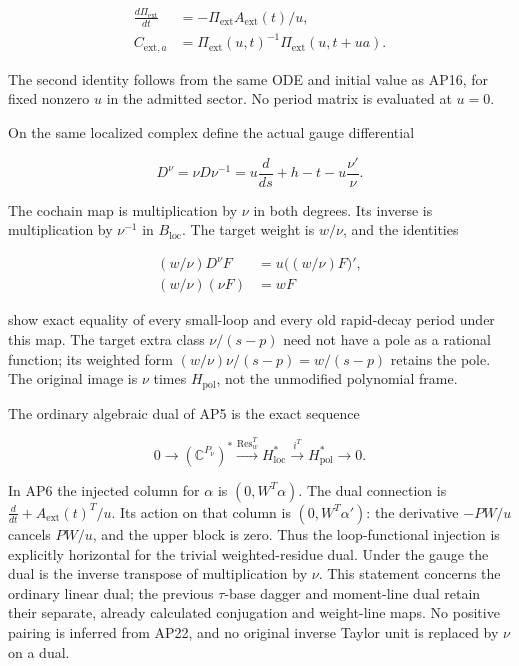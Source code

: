 \documentclass{article}
\begin{document}
\[
\begin{aligned}
\frac{d\Pi_{\mathrm{ext}}}{dt}&=-\Pi_{\mathrm{ext}}A_{\mathrm{ext}}(t)/u,\\
C_{\mathrm{ext},a}&=\Pi_{\mathrm{ext}}(u,t)^{-1}\Pi_{\mathrm{ext}}(u,t+ua).
\end{aligned}
\tag{AP19b}
\]

The second identity follows from the same ODE and initial value as AP16, for fixed nonzero \(u\) in the admitted sector. No period matrix is evaluated at \(u=0\).

On the same localized complex define the actual gauge differential

\[
D^\nu=\nu D\nu^{-1}
=u\frac{d}{ds}+h-t-u\frac{\nu'}{\nu}.
\tag{AP20}
\]

The cochain map is multiplication by \(\nu\) in both degrees. Its inverse is multiplication by \(\nu^{-1}\) in \(B_{\mathrm{loc}}\). The target weight is \(w/\nu\), and the identities

\[
\begin{aligned}
(w/\nu)D^\nu F&=u\bigl((w/\nu)F\bigr)',\\
(w/\nu)(\nu F)&=wF
\end{aligned}
\tag{AP21}
\]

show exact equality of every small-loop and every old rapid-decay period under this map. The target extra class \(\nu/(s-p)\) need not have a pole as a rational function; its weighted form \((w/\nu)\nu/(s-p)=w/(s-p)\) retains the pole. The original image is \(\nu\) times \(H_{\mathrm{pol}}\), not the unmodified polynomial frame.

The ordinary algebraic dual of AP5 is the exact sequence

\[
0\longrightarrow(\mathbb C^{P_\nu})^*
\xrightarrow{\operatorname{Res}_w^T}H_{\mathrm{loc}}^*
\xrightarrow{i^T}H_{\mathrm{pol}}^*\longrightarrow0.
\tag{AP22}
\]

In AP6 the injected column for \(\alpha\) is \((0,W^T\alpha)\). The dual connection is \(\frac{d}{dt}+A_{\mathrm{ext}}(t)^T/u\). Its action on that column is \((0,W^T\alpha')\): the derivative \(-P W/u\) cancels \(P W/u\), and the upper block is zero. Thus the loop-functional injection is explicitly horizontal for the trivial weighted-residue dual. Under the gauge the dual is the inverse transpose of multiplication by \(\nu\). This statement concerns the ordinary linear dual; the previous \(\tau\)-base dagger and moment-line dual retain their separate, already calculated conjugation and weight-line maps. No positive pairing is inferred from AP22, and no original inverse Taylor unit is replaced by \(\nu\) on a dual.
\end{document}
